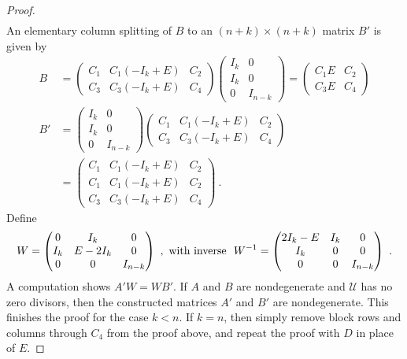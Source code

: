 \documentclass{amsart}
\theoremstyle{definition}
\theoremstyle{remark}
\numberwithin{equation}{section}
\begin{document}
{\begin{proof}
\begin{align*}
\end{align*} 
An elementary column splitting of $B$ to an $(n+k)\times (n+k)$ matrix $B'$ 
is given by 
\begin{align*}
B & = 
 \begin{pmatrix} C_1 & C_1(-I_k+E)& C_2\\ C_3 & C_3(-I_k+E) &C_4 \end{pmatrix} 
\begin{pmatrix} I_k & 0 \\ I_k& 0 \\ 0 & I_{n-k} \end{pmatrix} 
=\begin{pmatrix} C_1E & C_2\\C_3E&C_4 \end{pmatrix}  \\ 
B'&= 
\begin{pmatrix} I_k & 0 \\ I_k& 0 \\ 0 & I_{n-k} \end{pmatrix} 
 \begin{pmatrix} C_1 & C_1(-I_k+E)& C_2\\ 
C_3 & C_3(-I_k+E) &C_4 \end{pmatrix} \\ 
&=  \begin{pmatrix} C_1 & C_1(-I_k+E)& C_2\\ C_1 & C_1(-I_k+E)& C_2\\ 
 C_3 & C_3(-I_k+E) &C_4 \end{pmatrix} \ .
\end{align*} 
Define 
\[ 
W =\begin{pmatrix} 0 & I_k & 0 \\ I_k & E-2I_k & 0 \\ 0 & 0 & I_{n-k}
\end{pmatrix}\ , \textnormal{ with inverse }\  
W^{-1} =  
\begin{pmatrix} 2I_k -E & I_k & 0 \\ I_k & 0 & 0 \\ 0 & 0 & I_{n-k}
\end{pmatrix}\ . 
\]  
A computation shows $A'W = WB'$. If $A$ and $B$ are nondegenerate and 
$\mathcal U$ has no zero divisors,  
then the constructed matrices $A'$ and $B'$ are nondegenerate. 
This finishes the proof for the case $k<n$. If $k=n$, then  
simply remove block rows and columns through $C_4$ from the proof above, 
and repeat the proof with $D$ in place of $E$. 
\end{proof}

}
\end{document}
